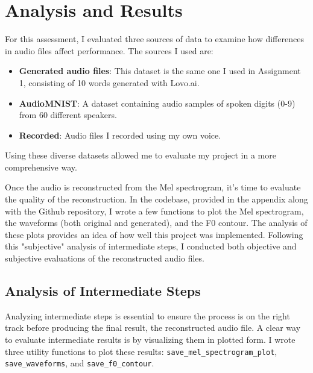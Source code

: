 \documentclass[12pt]{article}
\begin{document}



\section{Analysis and Results}
For this assessment, I evaluated three sources of data to examine how differences in audio files affect performance. The sources I used are:

\begin{itemize}
    \item \textbf{Generated audio files}: This dataset is the same one I used in Assignment 1, consisting of 10 words generated with Lovo.ai.
    \item \textbf{AudioMNIST}: A dataset containing audio samples of spoken digits (0-9) from 60 different speakers.
    \item \textbf{Recorded}: Audio files I recorded using my own voice.
\end{itemize}

Using these diverse datasets allowed me to evaluate my project in a more comprehensive way.

Once the audio is reconstructed from the Mel spectrogram, it’s time to evaluate the quality of the reconstruction. In the codebase, provided in the appendix along with the Github repository, I wrote a few functions to plot the Mel spectrogram, the waveforms (both original and generated), and the F0 contour. The analysis of these plots provides an idea of how well this project was implemented. Following this "subjective" analysis of intermediate steps, I conducted both objective and subjective evaluations of the reconstructed audio files.

\subsection{Analysis of Intermediate Steps}

Analyzing intermediate steps is essential to ensure the process is on the right track before producing the final result, the reconstructed audio file. A clear way to evaluate intermediate results is by visualizing them in plotted form. I wrote three utility functions to plot these results: \texttt{save\_mel\_spectrogram\_plot}, \texttt{save\_waveforms}, and \texttt{save\_f0\_contour}.
\end{document}
